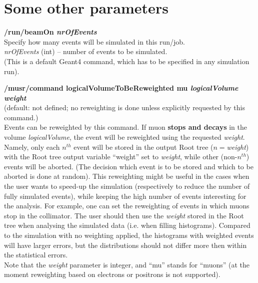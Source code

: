 \documentclass[twoside]{dis04}
\begin{document}
\section{Some other parameters}
%
\begin{description}
\item{\bf /run/beamOn \emph{nrOfEvents}}\\
	Specify how many events will be simulated in this run/job.\\
	\emph{nrOfEvents} (int) -- number of events to be simulated.\\
	(This is a default Geant4 command, which has to be specified in any simulation run).

\item{\bf /musr/command logicalVolumeToBeReweighted mu \emph{logicalVolume} \emph{weight} }\\
	(default: not defined; no reweighting is done unless explicitly requested by this command.) \\
	Events can be reweighted by this command.  If muon {\bf stops and decays} in the
	volume \emph{logicalVolume}, the event will be reweighted using the requested \emph{weight}.  
	Namely, only each $n^{th}$ event will be stored in the output Root tree ($n=$\emph{weight})
	with the Root tree output variable 
	``weight'' set to \emph{weight}, while other (non-$n^{th}$) events
	will be aborted. (The decision which event is to be stored and which to be aborted is
	done at random).  This reweighting might be useful in the cases when the user wants to speed-up the
	simulation (respectively to reduce the number of fully simulated events), while keeping
	the high number of events interesting for the analysis.  For example, one can set
	the reweighting of events in which muons stop in the collimator.  The user should then
	use the \emph{weight} stored in the Root tree when analysing the simulated data (i.e. when 
	filling histograms).  
	Compared to the simulation with no weighting applied, the histograms with weighted events
	will have larger errors, but the distributions should not differ more then within the
	statistical errors.\\
	Note that the \emph{weight} parameter is integer, and ``mu'' stands for ``muons''
	(at the moment reweighting based on electrons or positrons is not supported).


\end{description}
\end{document}

